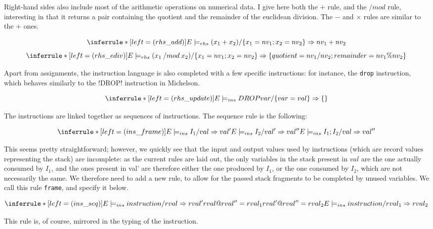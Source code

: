 \documentclass{report}
\begin{document}
Right-hand sides also include most of the arithmetic operations on numerical data. I give here both the $+$ rule, and the $/mod$ rule, interesting in that it returns a pair containing the quotient and the remainder of the euclidean division. The $-$ and $\times$ rules are similar to the $+$ ones.

$$
\inferrule* [left=(rhs\_add)]
    {  }
    { E \models_{rhs} (x_1 + x_2) / \{ x_1 = nv_1 ; x_2 = nv_2 \} \Rightarrow nv_1 + nv_2 }
$$
$$
\inferrule* [left=(rhs\_ediv)]
    { }
    { E \models_{rhs} (x_1\:/mod\:x_2) / \{ x_1 = nv_1 ; x_2 = nv_2 \} \Rightarrow \{ quotient = nv_1 / nv_2 ; remainder = nv_1 \% nv_2 \} }
$$

Apart from assignments, the instruction language is also completed with a few specific instructions: for instance, the \lstinline{drop} instruction, which behaves similarly to the !DROP! instruction in Michelson.

$$
\inferrule* [left=(rhs\_update)]
    { }
    { E \models_{ins} DROP var / \{ var = val \} \Rightarrow \{ \} }
$$

The instructions are linked together as sequences of instructions. The sequence rule is the following:

$$
\inferrule* [left=(ins\_frame)]
    { E \models_{ins} I_1 / val \Rightarrow val' \\
      E \models_{ins} I_2 / val' \Rightarrow val'' }
    { E \models_{ins} I_1 ; I_2 / val \Rightarrow val'' }
$$

This seems pretty straightforward; however, we quickly see that the input and output values used by instructions (which are record values representing the stack) are incomplete: as the current rules are laid out, the only variables in the stack present in $val$ are the one actually consumed by $I_1$, and the ones present in val' are therefore either the one produced by $I_1$, or the one consumed by $I_2$, which are not necessarily the same. We therefore need to add a new rule, to allow for the passed stack fragments to be completed by unused variables. We call this rule \texttt{frame}, and specify it below.

$$
\inferrule* [left=(ins\_seq)]
    { E \models_{ins} instruction / rval \Rightarrow rval' \\
      rval @ rval'' = rval_1 \\
      rval' @ rval'' = rval_2 }
    { E \models_{ins} instruction / rval_1 \Rightarrow rval_2 }
$$

This rule is, of course, mirrored in the typing of the instruction.\\
\end{document}
